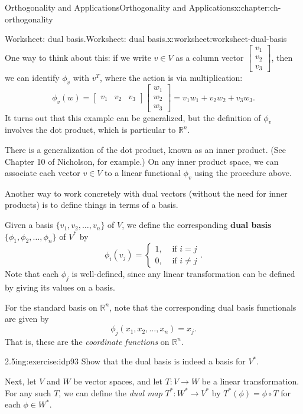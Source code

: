 \documentclass[oneside,10pt,]{book}
\newcommand{\terminology}[1]{\textbf{#1}}
\numberwithin{equation}{section}
\newcommand{\bbm}{\begin{bmatrix}}
\newcommand{\ebm}{\end{bmatrix}}
\newcommand{\R}{\mathbb{R}}
\newcommand{\amp}{&}
\begin{document}
\begin{chapterptx}{Orthogonality and Applications}{}{Orthogonality and Applications}{}{}{x:chapter:ch-orthogonality}
\begin{worksheet-section}{Worksheet: dual basis.}{}{Worksheet: dual basis.}{}{}{x:worksheet:worksheet-dual-basis}
One way to think about this: if we write \(v\in V\) as a column vector \(\bbm v_1\\v_2\\v_3\ebm\), then we can identify \(\phi_{v}\) with \(v^T\), where the action is via multiplication:%
\begin{equation*}
\phi_{v}(w) = \bbm v_1\amp v_2\amp v_3\ebm\bbm w_1\\w_2\\w_3\ebm = v_1w_1+v_2w_2+v_3w_3\text{.}
\end{equation*}
It turns out that this example can be generalized, but the definition of \(\phi_v\) involves the dot product, which is particular to \(\R^n\).%
\par
There is a generalization of the dot product, known as an inner product. (See Chapter 10 of Nicholson, for example.) On any inner product space, we can associate each vector \(v\in V\) to a linear functional \(\phi_v\) using the procedure above.%
\par
Another way to work concretely with dual vectors (without the need for inner products) is to define things in terms of a basis.%
\par
Given a basis \(\{v_1,v_2,\ldots, v_n\}\) of \(V\), we define the corresponding \terminology{dual basis} \(\{\phi_1,\phi_2,\ldots, \phi_n\}\) of \(V^*\) by%
\begin{equation*}
\phi_i(v_j) = \begin{cases} 1, \amp \text{ if } i=j\\ 0, \amp \text{ if } i\neq j\end{cases}\text{.}
\end{equation*}
Note that each \(\phi_j\) is well-defined, since any linear transformation can be defined by giving its values on a basis.%
\par
For the standard basis on \(\R^n\), note that the corresponding dual basis functionals are given by%
\begin{equation*}
\phi_j(x_1,x_2,\ldots, x_n) = x_j\text{.}
\end{equation*}
That is, these are the \emph{coordinate functions} on \(\R^n\).%
\clearpage
\begin{divisionexercise}{1}{}{2.5in}{g:exercise:idp93}%
Show that the dual basis is indeed a basis for \(V^*\).%
\end{divisionexercise}%
Next, let \(V\) and \(W\) be vector spaces, and let \(T:V\to W\) be a linear transformation. For any such \(T\), we can define the \emph{dual map} \(T^*:W^*\to V^*\) by \(T^*(\phi) = \phi\circ T\) for each \(\phi\in W^*\).%

\end{worksheet-section}
\end{chapterptx}
\end{document}
